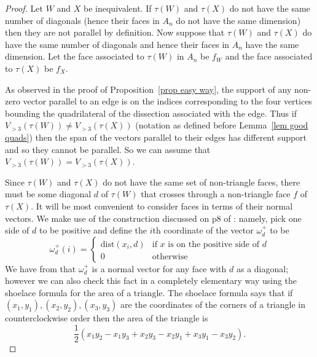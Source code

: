 \documentclass[11pt]{article}
\theoremstyle{remark}
\theoremstyle{definition}
\begin{document}
\begin{proof}
  Let $W$ and $X$ be inequivalent.  If $\tau(W)$ and $\tau(X)$ do not have the same number of diagonals (hence their faces in $A_n$ do not have the same dimension) then they are not parallel by definition. Now suppose that $\tau(W)$ and $\tau(X)$ do have the same number of diagonals and hence their faces in $A_n$ have the same dimension.  Let the face associated to $\tau(W)$ in $A_n$ be $f_W$ and the face associated to $\tau(X)$ be $f_X$.

  As observed in the proof of Proposition~\ref{prop easy way}, the support of any non-zero vector parallel to an edge is on the indices corresponding to the four vertices bounding the quadrilateral of the dissection associated with the edge.  Thus if $V_{>3}(\tau(W)) \neq V_{>3}(\tau(X))$ (notation as defined before Lemma~\ref{lem good quads}) then the span of the vectors parallel to their edges has different support and so they cannot be parallel.  So we can assume that $V_{>3}(\tau(W)) = V_{>3}(\tau(X))$.

    Since $\tau(W)$ and $\tau(X)$ do not have the same set of non-triangle faces, there must be some diagonal $d$ of $\tau(W)$ that crosses through a non-triangle face $f$ of $\tau(X)$. 
    It will be most convenient to consider faces in terms of their normal vectors. We make use of the construction discussed on p8 of \cite{CSZinequivalent}: namely, pick one side of $d$ to be positive and define the $i$th coordinate of the vector $\omega^+_d$ to be
    \[
    \omega^+_d(i) = \begin{cases} \text{dist}(x_i, d) & \text{if $x$ is on the positive side of $d$}\\ 0 & \text{otherwise} \end{cases}
    \]
    We have from \cite{CSZinequivalent} that $\omega^+_d$ is a normal vector for any face with $d$ as a diagonal; however we can also check this fact in a completely elementary way using the shoelace formula for the area of a triangle.  The shoelace formula says that if $(x_1, y_1), (x_2, y_2), (x_3, y_3)$ are the coordinates of the corners of a triangle in counterclockwise order then the area of the triangle is \[\textstyle\frac{1}{2}(x_1y_2 - x_1y_3 + x_2y_3 - x_2y_1 + x_3y_1 - x_3y_2).\]


\end{proof}
\end{document}
